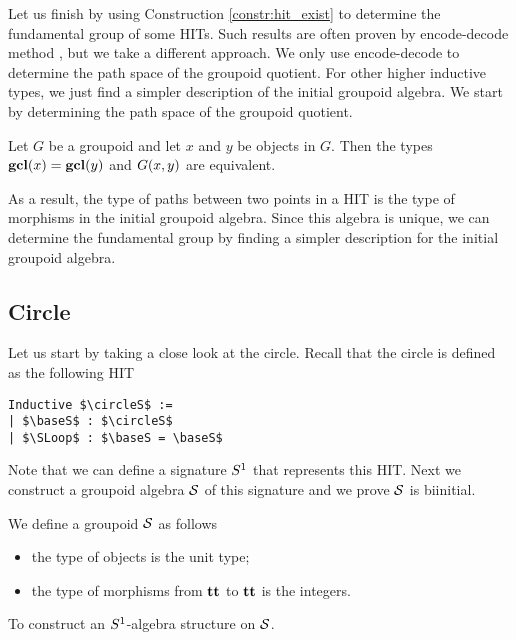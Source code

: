 Let us finish by using Construction \ref{constr:hit_exist} to determine the fundamental group of some HITs.
Such results are often proven by encode-decode method \cite{LicataS13,LicataF14}, but we take a different approach.
We only use encode-decode to determine the path space of the groupoid quotient.
For other higher inductive types, we just find a simpler description of the initial groupoid algebra.
We start by determining the path space of the groupoid quotient.

\begin{proposition}
\label{prop:groupoid_quot_encode_decode}
Let $G$ be a groupoid and let $x$ and $y$ be objects in $G$.
Then the types $\operatorname{\mathbf{gcl}}(x) = \operatorname{\mathbf{gcl}}(y)$ and $G(x, y)$ are equivalent.
\end{proposition}

As a result, the type of paths between two points in a HIT is the type of morphisms in the initial groupoid algebra.
Since this algebra is unique, we can determine the fundamental group by finding a simpler description for the initial groupoid algebra.

\subsection{Circle}
\label{sec:circle_fund_group}
Let us start by taking a close look at the circle.
Recall that the circle is defined as the following HIT

\begin{lstlisting}[mathescape=true]
Inductive $\circleS$ :=
| $\baseS$ : $\circleS$
| $\SLoop$ : $\baseS = \baseS$
\end{lstlisting}

Note that we can define a signature $S^1$ that represents this HIT.
Next we construct a groupoid algebra $\mathcal{S}$ of this signature and we prove $\mathcal{S}$ is biinitial.

\begin{definition}
We define a groupoid $\mathcal{S}$ as follows
\begin{itemize}
	\item the type of objects is the unit type;
	\item the type of morphisms from $\operatorname{\mathbf{tt}}$ to $\operatorname{\mathbf{tt}}$ is the integers.
\end{itemize}
\end{definition}

\begin{problem}
\label{prob:initial_grpd_alg_circle}
To construct an $S^1$-algebra structure on $\mathcal{S}$.
\end{problem}

